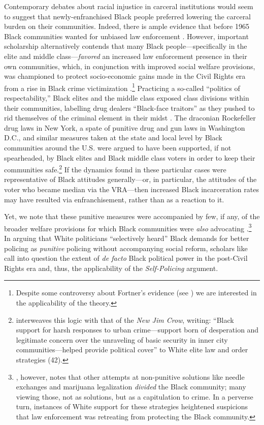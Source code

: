 \documentclass[12pt]{article}
\begin{document}
Contemporary debates about racial injustice in carceral institutions would seem to suggest that newly-enfranchised Black people preferred lowering the carceral burden on their communities.  Indeed, there is ample evidence that before 1965 Black communities wanted for unbiased law enforcement \citep{USCCRUnitedStatesCommissiononCivilRights:1965wk}.  However, important scholarship alternatively contends that many Black people---specifically in the elite and middle class---\emph{favored} an increased law enforcement presence in their own communities, which, in conjunction with improved social welfare provisions, was championed to protect socio-economic gains made in the Civil Rights era from a rise in Black crime victimization \citep{Miller:2008wb,Fortner:2015uz,FormanJr:2017tz}.\footnote{Despite some controversy about Fortner's evidence (see \cite{Murch:2015vu}) we are interested in the applicability of the theory.}  Practicing a so-called ``politics of respectability,'' Black elites and the middle class exposed class divisions within their communities, labelling drug dealers ``Black-face traitors'' as they pushed to rid themselves of the criminal element in their midst \citep{Kennedy:1998te,FormanJr:2017tz}.  The draconian Rockefeller drug laws in New York, a spate of punitive drug and gun laws in Washington D.C., and similar measures taken at the state and local level by Black communities around the U.S. were argued to have been supported, if not spearheaded, by Black elites and Black middle class voters in order to keep their communities safe.\footnote{\cite{Alexander:2012tj} interweaves this logic with that of the \emph{New Jim Crow}, writing: ``Black support for harsh responses to urban crime---support born of desperation and legitimate concern over the unraveling of basic security in inner city communities---helped provide political cover'' to White elite law and order strategies (42).}  If the dynamics found in these particular cases were representative of Black attitudes generally---or, in particular, the attitudes of the voter who became median via the VRA---then increased Black incarceration rates may have resulted via enfranchisement, rather than as a reaction to it.

Yet, we note that these punitive measures were accompanied by few, if any, of the broader welfare provisions for which Black communities were \emph{also} advocating \cite{KohlerHausmann:2015uk}.\footnote{\cite{FormanJr:2017tz}, however, notes that other attempts at non-punitive solutions like needle exchanges and marijuana legalization \emph{divided} the Black community; many viewing those, not as solutions, but as a capitulation to crime.  In a perverse turn, instances of White support for these strategies heightened suspicions that law enforcement was retreating from protecting the Black community.} In arguing that White politicians ``selectively heard'' Black demands for better policing as \emph{punitive} policing without accompanying social reform, scholars like \cite{Hinton:2016td} call into question the extent of \emph{de facto} Black political power in the post-Civil Rights era and, thus, the applicability of the \emph{Self-Policing} argument.
\end{document}
